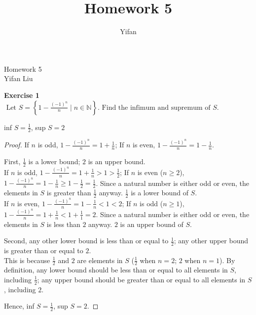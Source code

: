\documentclass[12pt]{article}
\title{Homework 5}
\author{Yifan}
\theoremstyle{definition}
\numberwithin{equation}{subsection}
\begin{document}
\pagestyle{plain}



\begin{center}
{\large Homework 5} \\
\vspace{.2in}
Yifan Liu
\end{center}

\bigskip \bigskip


\textbf{Exercise 1} $\text { Let } S=\left\{1-\frac{(-1)^{n}}{n} 
\mid n \in \mathbb{N}\right\} . 
\text { Find the infimum and supremum of } S$.
\begin{center}
    inf $S = \frac{1}{2}$, sup $S = 2$
\end{center}
\begin{proof}
If $n$ is odd, $1-\frac{(-1)^{n}}{n} = 1+\frac{1}{n}$;
If $n$ is even, $1-\frac{(-1)^{n}}{n} = 1-\frac{1}{n}$.

First, $\frac{1}{2}$ is a lower bound; $2$ is an upper bound.\\
If $n$ is odd, $1-\frac{(-1)^{n}}{n} = 1+\frac{1}{n} > 1 > \frac{1}{2}$; If $n$ is even ($n \geq 2$), $1-\frac{(-1)^{n}}{n} = 1-\frac{1}{n} \geq 1-\frac{1}{2} = \frac{1}{2}$. Since a natural number is either odd or even, the elements in $S$ is greater than $\frac{1}{2}$ anyway. $\frac{1}{2}$ is a lower bound of $S$.\\
If $n$ is even, $1-\frac{(-1)^{n}}{n} = 1-\frac{1}{n} < 1 < 2$; If $n$ is odd ($n \geq 1$), $1-\frac{(-1)^{n}}{n} = 1+\frac{1}{n} < 1+\frac{1}{1} = 2$.
Since a natural number is either odd or even, the elements in $S$ is less than $2$ anyway. $2$ is an upper bound of $S$.

Second, any other lower bound is less than or equal to $\frac{1}{2}$; any other upper bound is greater than or equal to $2$.\\
This is because $\frac{1}{2}$ and $2$ are elements in $S$ ($\frac{1}{2}$ when $n =2$; $2$ when $n=1$). By definition, any lower bound should be less than or equal to all elements in $S$, including $\frac{1}{2}$; any upper bound should be greater than or equal to all elements in $S$, including $2$.
    
Hence, inf $S = \frac{1}{2}$, sup $S = 2$.
\end{proof}
\end{document}
